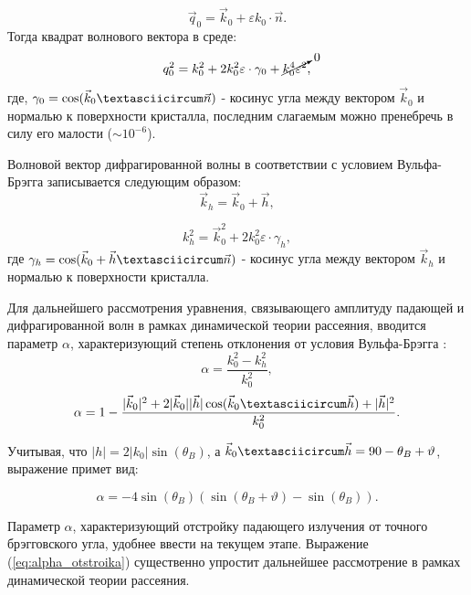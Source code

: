  \begin{equation}
   \vec{q}_0 = \vec{k}_0 + \varepsilon k_0 \cdot \vec{n}.
  \end{equation}
Тогда квадрат волнового вектора в среде:
\begin{equation}
   q_0^2 = k_0^2 + 2k_0^2 \varepsilon \cdot \gamma_0 + \cancelto{0}{k_0^4  \varepsilon^2},
   \label{eq:k_0_squred}
 \end{equation}
\noindent
где, $\gamma_0 = \cos(\vec{k}_0 \textasciicircum \vec{n})$ - косинус угла между вектором $\vec{k}_0$ и нормалью к поверхности кристалла,
последним слагаемым можно пренебречь в силу его малости ($\sim 10^{-6}$).

  Волновой вектор дифрагированной волны в соответствии с условием Вульфа-Брэгга записывается следующим образом:
  $$\vec{k}_h = \vec{k}_0+\vec{h},$$

  \begin{equation}
     k_h^2 = \vec{k}_0^2+2k_0^2 \varepsilon \cdot \gamma_h,
     \label{eq:k_h_squred}
   \end{equation}
\noindent
где $\gamma_h = \cos(\vec{k}_0+ \vec{h} \textasciicircum \vec{n})$ - косинус угла между вектором $\vec{k}_h$ и нормалью к поверхности кристалла.

Для дальнейшего рассмотрения уравнения, связывающего амплитуду падающей и дифрагированной волн в рамках
динамической теории рассеяния, вводится параметр $\alpha$,
характеризующий степень отклонения от условия Вульфа-Брэгга \cite{Bushuev_Oreshko_2002}:
\begin{equation}
   \alpha = \frac{k_0^2-k_h^2}{k_0^2},
   \label{eq:alpha}
\end{equation}
$$  \alpha = 1 - \frac{|\vec{k}_0|^2+2|\vec{k}_0||\vec{h}|\cos(\vec{k}_0 \textasciicircum \vec{h})+|\vec{h}|^2}{k_0^2}.$$

Учитывая, что $ |h| = 2|k_0| \sin(\theta_B) $, а $\vec{k}_0 \textasciicircum \vec{h} = 90-\theta_B+\vartheta$,
выражение примет вид:

\begin{equation}
   \alpha = -4\sin(\theta_B)(\sin(\theta_B+\vartheta)-\sin(\theta_B)).
   \label{eq:alpha_otstroika}
\end{equation}

Параметр $\alpha$, характеризующий отстройку падающего излучения от точного брэгговского угла, удобнее ввести на
текущем этапе. Выражение (\ref{eq:alpha_otstroika}) существенно упростит
 дальнейшее рассмотрение в рамках динамической теории рассеяния.

